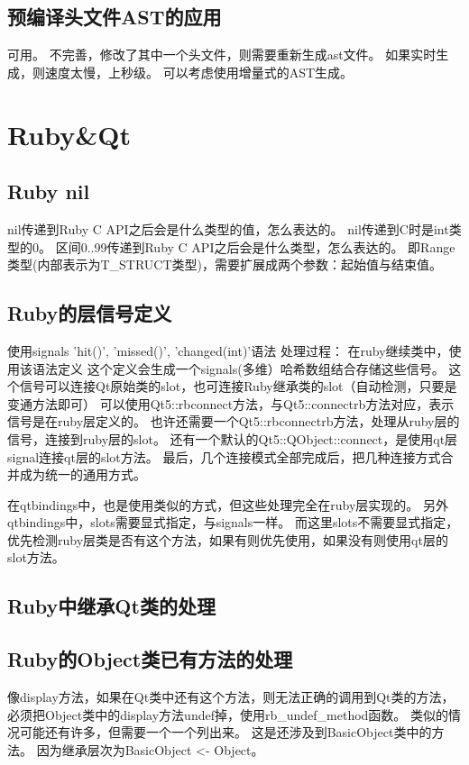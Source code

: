 \section{预编译头文件AST的应用}
可用。
不完善，修改了其中一个头文件，则需要重新生成ast文件。
如果实时生成，则速度太慢，上秒级。
可以考虑使用增量式的AST生成。

\chapter{Ruby&Qt}
\section{Ruby nil}
nil传递到Ruby C API之后会是什么类型的值，怎么表达的。
nil传递到C时是int类型的0。
区间0..99传递到Ruby C API之后会是什么类型，怎么表达的。
即Range类型(内部表示为T\_STRUCT类型)，需要扩展成两个参数：起始值与结束值。

\section{Ruby的层信号定义}
使用signals 'hit()', 'missed()', 'changed(int)'语法
处理过程：
在ruby继续类中，使用该语法定义
这个定义会生成一个signals(多维）哈希数组结合存储这些信号。
这个信号可以连接Qt原始类的slot，也可连接Ruby继承类的slot（自动检测，只要是变通方法即可）
可以使用Qt5::rbconnect方法，与Qt5::connectrb方法对应，表示信号是在ruby层定义的。
也许还需要一个Qt5::rbconnectrb方法，处理从ruby层的信号，连接到ruby层的slot。
还有一个默认的Qt5::QObject::connect，是使用qt层signal连接qt层的slot方法。
最后，几个连接模式全部完成后，把几种连接方式合并成为统一的通用方式。

在qtbindings中，也是使用类似的方式，但这些处理完全在ruby层实现的。
另外qtbindings中，slots需要显式指定，与signals一样。
而这里slots不需要显式指定，优先检测ruby层类是否有这个方法，如果有则优先使用，如果没有则使用qt层的slot方法。

\section{Ruby中继承Qt类的处理}

\section{Ruby的Object类已有方法的处理}
像display方法，如果在Qt类中还有这个方法，则无法正确的调用到Qt类的方法，
必须把Object类中的display方法undef掉，使用rb\_undef\_method函数。
类似的情况可能还有许多，但需要一个一个列出来。
这是还涉及到BasicObject类中的方法。
因为继承层次为BasicObject <- Object。

